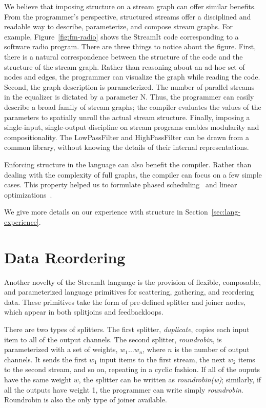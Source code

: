 We believe that imposing structure on a stream graph can offer similar
benefits.  From the programmer's perspective, structured streams offer
a disciplined and readable way to describe, parameterize, and compose
stream graphs.  For example, Figure~\ref{fig:fm-radio} shows the
StreamIt code corresponding to a software radio program.  There are
three things to notice about the figure.  First, there is a natural
correspondence between the structure of the code and the structure of
the stream graph.  Rather than reasoning about an ad-hoc set of nodes
and edges, the programmer can visualize the graph while reading the
code.  Second, the graph description is parameterized.  The number of
parallel streams in the equalizer is dictated by a parameter N.  Thus,
the programmer can easily describe a broad family of stream graphs;
the compiler evaluates the values of the parameters to spatially
unroll the actual stream structure.  Finally, imposing a single-input,
single-output discipline on stream programs enables modularity and
compositionality.  The LowPassFilter and HighPassFilter can be drawn
from a common library, without knowing the details of their internal
representations.

Enforcing structure in the language can also benefit the compiler.
Rather than dealing with the complexity of full graphs, the compiler
can focus on a few simple cases.  This property helped us to formulate
phased scheduling~\cite{karczmarek:lctes:2003,karczmarek-thesis} and
linear
optimizations~\cite{lamb:pldi:2003,lamb-thesis,agrawal:cases:2005,agrawal-thesis}.

We give more details on our experience with structure in Section~\ref{sec:lang-experience}.

\section{Data Reordering}

Another novelty of the StreamIt language is the provision of flexible,
composable, and parameterized language primitives for scattering,
gathering, and reordering data.  These primitives take the form of
pre-defined splitter and joiner nodes, which appear in both splitjoins
and feedbackloops.

There are two types of splitters.  The first splitter, {\it
  duplicate}, copies each input item to all of the output channels.
The second splitter, {\it roundrobin}, is parameterized with a set of
weights, $w_1 \dots w_n$, where $n$ is the number of output channels.
It sends the first $w_1$ input items to the first stream, the next
$w_2$ items to the second stream, and so on, repeating in a cyclic
fashion.  If all of the ouputs have the same weight $w$, the splitter
can be written as {\it roundrobin(w)}; similarly, if all the outputs
have weight 1, the programmer can write simply {\it roundrobin}.
Roundrobin is also the only type of joiner available.

